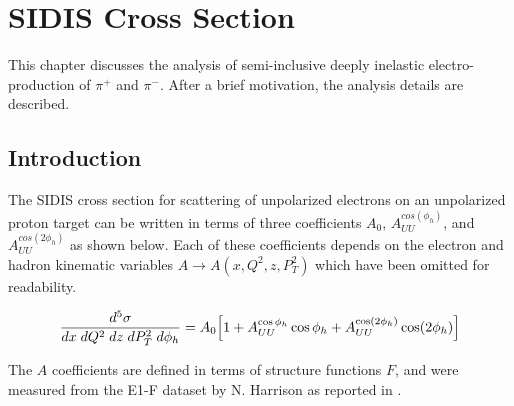 %
%
%
%
 

\chapter{SIDIS Cross Section}
This chapter discusses the analysis of semi-inclusive deeply inelastic electro-production of $\pi^+$ and $\pi^-$.  After a brief motivation, the analysis details are described.  

\section{Introduction}
The SIDIS cross section for scattering of unpolarized electrons on an unpolarized proton target can be written in terms of three coefficients $A_{0}$, $A_{UU}^{cos(\phi_h)}$, and $A_{UU}^{cos(2\phi_h)}$ as shown below.  Each of these coefficients depends on the electron and hadron kinematic variables $A \rightarrow A(x, Q^2, z, P_T^2)$ which have been omitted for readability.

\begin{equation}
	\frac{d^5\sigma}{dx \; dQ^2 \; dz \; dP_T^2 \; d\phi_h} = A_{0} \Bigl[ 1 + A_{UU}^{\cos\phi_h} \cos\phi_h + A_{UU}^{\cos(2\phi_h)} \cos(2\phi_h) \Bigr]
\end{equation}

The $A$ coefficients are defined in terms of structure functions $F$, and were measured from the E1-F dataset by N. Harrison as reported in \cite{thesis-harrison:2015}.   

